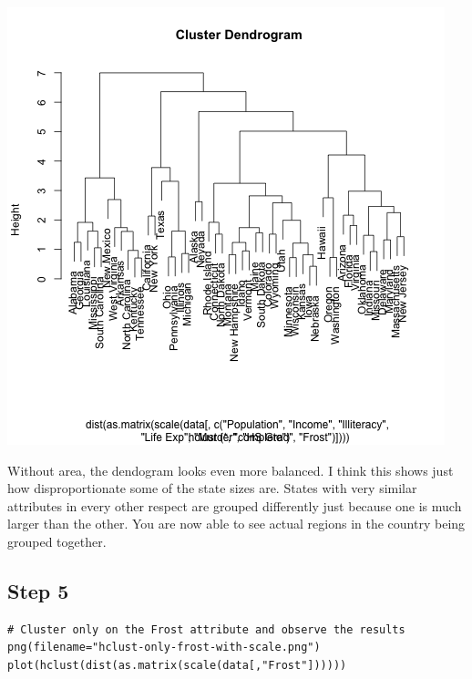 \documentclass[11pt]{article}
\begin{document}
\begin{center}
\includegraphics[width=.9\linewidth]{hclust-no-area-with-scale.png}
\end{center}

Without area, the dendogram looks even more balanced. I think this shows just
how disproportionate some of the state sizes are. States with very similar
attributes in every other respect are grouped differently just because one is
much larger than the other. You are now able to see actual regions in the
country being grouped together. 

\subsection*{Step 5}
\label{sec:orgc3bddae}

\begin{verbatim}
# Cluster only on the Frost attribute and observe the results
png(filename="hclust-only-frost-with-scale.png")
plot(hclust(dist(as.matrix(scale(data[,"Frost"])))))
\end{verbatim}
\end{document}
